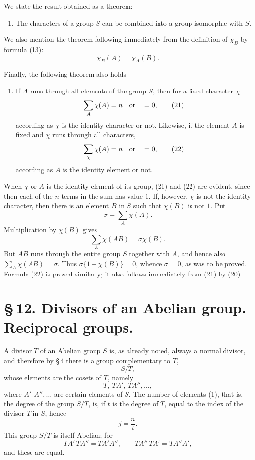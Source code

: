 \documentclass[11pt]{article}
\begin{document}
We state the result obtained as a theorem:

\begin{enumerate}[resume,label=\arabic*.]
\item The characters of a group $S$ can be combined into a group isomorphic with $S$.
\end{enumerate}

We also mention the theorem following immediately from the definition of $\chi_B$ by formula (13):
\begin{equation}
\chi_B(A)=\chi_A(B).
\tag{20}
\end{equation}

Finally, the following theorem also holds:

\begin{enumerate}[resume,label=\arabic*.]
\item If $A$ runs through all elements of the group $S$, then for a fixed character $\chi$
\begin{equation}
\sum_A\chi(A)=n\quad\hbox{or}\quad =0,
\tag{21}
\end{equation}
according as $\chi$ is the identity character or not. Likewise, if the element $A$ is fixed and $\chi$ runs through all characters,
\begin{equation}
\sum_\chi \chi(A)=n\quad\hbox{or}\quad =0,
\tag{22}
\end{equation}
according as $A$ is the identity element or not.
\end{enumerate}

When $\chi$ or $A$ is the identity element of its group, (21) and (22) are evident, since then each of the $n$ terms in the sum has value $1$. If, however, $\chi$ is not the identity character, then there is an element $B$ in $S$ such that $\chi(B)$ is not $1$. Put
\[
\sigma=\sum_A\chi(A).
\]
Multiplication by $\chi(B)$ gives
\[
\sum_A\chi(AB)=\sigma\chi(B).
\]
But $AB$ runs through the entire group $S$ together with $A$, and hence also $\sum_A\chi(AB)=\sigma$. Thus $\sigma\{1-\chi(B)\}=0$, whence $\sigma=0$, as was to be proved. Formula (22) is proved similarly; it also follows immediately from (21) by (20).

\section*{\S\,12. Divisors of an Abelian group. Reciprocal groups.}

A divisor $T$ of an Abelian group $S$ is, as already noted, always a normal divisor, and therefore by \S\,4 there is a group complementary to $T$,
\[
S/T,
\]
whose elements are the cosets of $T$, namely
\begin{equation}
T,
\ TA',
\ TA'',
\ldots,
\tag{1}
\end{equation}
where $A',A'',\ldots$ are certain elements of $S$. The number of elements (1), that is, the degree of the group $S/T$, is, if $t$ is the degree of $T$, equal to the index of the divisor $T$ in $S$, hence
\[
j=\frac nt.
\]
This group $S/T$ is itself Abelian; for
\[
TA'\,TA''=TA'A'',
\qquad
TA''\,TA'=TA''A',
\]
and these are equal.
\end{document}
